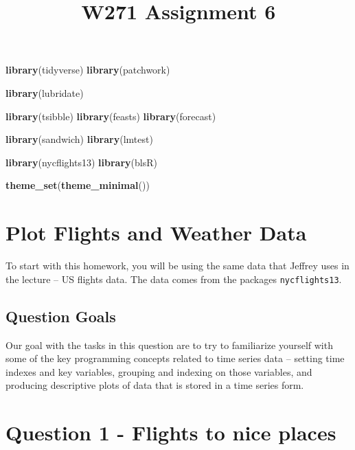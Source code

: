 \documentclass[
]{article}
\title{W271 Assignment 6}
\author{}
\date{\vspace{-2.5em}}
\newenvironment{Shaded}{\begin{snugshade}}{\end{snugshade}}
\newcommand{\FunctionTok}[1]{\textcolor[rgb]{0.13,0.29,0.53}{\textbf{#1}}}
\newcommand{\NormalTok}[1]{#1}
\begin{document}
\maketitle

\begin{Shaded}
\begin{Highlighting}[]
\FunctionTok{library}\NormalTok{(tidyverse)}
\FunctionTok{library}\NormalTok{(patchwork) }

\FunctionTok{library}\NormalTok{(lubridate)}

\FunctionTok{library}\NormalTok{(tsibble)}
\FunctionTok{library}\NormalTok{(feasts)}
\FunctionTok{library}\NormalTok{(forecast)}

\FunctionTok{library}\NormalTok{(sandwich)}
\FunctionTok{library}\NormalTok{(lmtest)}

\FunctionTok{library}\NormalTok{(nycflights13)}
\FunctionTok{library}\NormalTok{(blsR)}
\end{Highlighting}
\end{Shaded}

\begin{Shaded}
\begin{Highlighting}[]
\FunctionTok{theme\_set}\NormalTok{(}\FunctionTok{theme\_minimal}\NormalTok{())}
\end{Highlighting}
\end{Shaded}

\section{Plot Flights and Weather
Data}\label{plot-flights-and-weather-data}

To start with this homework, you will be using the same data that
Jeffrey uses in the lecture -- US flights data. The data comes from the
packages \texttt{nycflights13}.

\subsection{Question Goals}\label{question-goals}

Our goal with the tasks in this question are to try to familiarize
yourself with some of the key programming concepts related to time
series data -- setting time indexes and key variables, grouping and
indexing on those variables, and producing descriptive plots of data
that is stored in a time series form.

\section{Question 1 - Flights to nice
places}\label{question-1---flights-to-nice-places}
\end{document}
